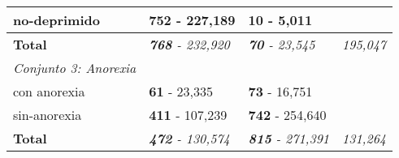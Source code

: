 \begin{table}[!hbt]
\begin{center}
\begin{tabular}{llll}
\rowcolor[HTML]{FFFFFF} 
no-deprimido                                                & \textbf{752} - 227,189                                & \textbf{10} - 5,011                                   &                                                              \\ \hline
\rowcolor[HTML]{FFFFFF} 
\textbf{Total}                                              & \textit{\textbf{768} - 232,920}                       & \textit{\textbf{70} - 23,545}                         & \multicolumn{1}{c}{\cellcolor[HTML]{FFFFFF}\textit{195,047}}    \\ \hline
\rowcolor[HTML]{EFEFEF} 
\textit{Conjunto 3: Anorexia}                               & \multicolumn{1}{c}{\cellcolor[HTML]{EFEFEF}} & \multicolumn{1}{c}{\cellcolor[HTML]{EFEFEF}} &                                                              \\ \hline
\rowcolor[HTML]{FFFFFF} 
con anorexia                                                & \textbf{61} - 23,335                                  & \textbf{73} - 16,751                                  &                                                              \\ \hline
\rowcolor[HTML]{FFFFFF} 
sin-anorexia                                                & \textbf{411} - 107,239                                 & \textbf{742} - 254,640                                &                                                              \\ \hline
\rowcolor[HTML]{FFFFFF} 
\textbf{Total}                                              & \textit{\textbf{472} - 130,574}                       & \textit{\textbf{815} - 271,391}                       & \multicolumn{1}{c}{\cellcolor[HTML]{FFFFFF}\textit{131,264}}  \\ \hline
\end{tabular}

\end{center}

\end{table}
